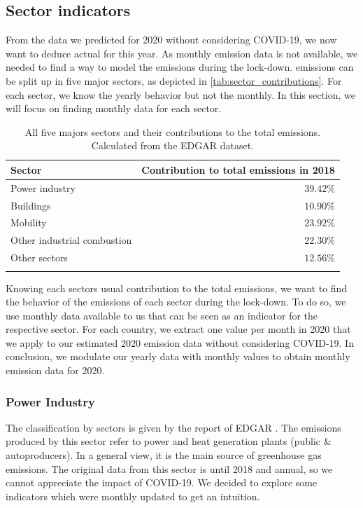 \subsection{Sector indicators}

From the \co data we predicted for 2020 without considering COVID-19, we now want to deduce actual \co for this year. As monthly \co emission data is not available, we needed to find a way to model the emissions during the lock-down.
\co emissions can be split up in five major sectors, as depicted in \autoref{tab:sector_contributions}. For each sector, we know the yearly behavior but not the monthly. In this section, we will focus on finding monthly data for each sector.

\begin{table}[h!]%
	\centering
	\begin{tabular}{lr}
		\hline
		Sector & Contribution to total emissions in 2018\\
		\hline
		\hline
		Power industry &  \(39.42\%\)\\ 
		Buildings &   \(10.90\%\)\\ 
		Mobility &   \(23.92\%\)\\ 
		Other industrial combustion &   \(22.30\%\)\\ 
		Other sectors &   \(12.56\%\)\\ 
		\hline &\\
	\end{tabular}
	\caption{All five majors sectors  and their contributions to the total \co emissions. Calculated from the EDGAR dataset.}%
	\label{tab:sector_contributions}	
\end{table}	



Knowing each sectors usual contribution to the total emissions, we want to find the behavior of the \co emissions of each sector during the lock-down. To do so, we use monthly data available to us that can be seen as an indicator for the respective sector. For each country, we extract one value per month in 2020 that we apply to our estimated 2020 \co emission data without considering COVID-19. In conclusion, we modulate our yearly data with monthly values to obtain monthly \co emission data for 2020.

\subsubsection{Power Industry}
The classification by sectors is given by the report of EDGAR \cite{crippa2019fossil}. The emissions produced by this sector refer to power and heat generation plants (public \& autoproducers). In a general view, it is the main source of greenhouse gas emissions. The original data from this sector is until 2018 and annual, so we cannot appreciate the impact of COVID-19. We decided to explore some indicators which were monthly updated to get an intuition. 


